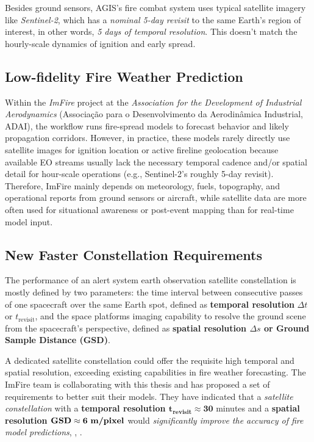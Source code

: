 Besides ground sensors, AGIS’s fire combat system uses typical satellite imagery 
like \emph{Sentinel-2}, which has a \emph{nominal 5-day revisit} to the same Earth’s region of 
interest, in other words, \emph{5 days of temporal resolution}\cite{esa_s2_facts}. 
This doesn’t match the hourly-scale dynamics of ignition and early spread.

\subsection{Low-fidelity Fire Weather Prediction}

Within the \emph{ImFire} project at the \emph{Association for the Development of Industrial Aerodynamics} (Associação para o Desenvolvimento da Aerodinâmica Industrial, ADAI), the workflow runs fire-spread models to forecast behavior and likely propagation corridors\cite{pereira_metaheuristic_2024}. However, in practice, these models rarely directly use satellite images for ignition location or active fireline geolocation because available EO streams usually lack the necessary temporal cadence and/or spatial detail for hour-scale operations (e.g., Sentinel-2’s roughly 5-day revisit). Therefore, ImFire mainly depends on meteorology, fuels, topography, and operational reports from ground sensors or aircraft, while satellite data are more often used for situational awareness or post-event mapping than for real-time model input.

\subsection{New Faster Constellation Requirements}

The performance of an alert system earth observation satellite constellation is mostly defined by two parameters: the time interval between consecutive passes of one spacecraft over the same Earth spot, defined as \textbf{temporal resolution} $\Delta t$ or $t_{\text{revisit}}$, and the space platforms imaging capability to resolve the ground scene from the spacecraft's perspective, defined as \textbf{spatial resolution $\Delta s$ or Ground Sample Distance (GSD)}. 

A dedicated satellite constellation could offer the requisite high temporal and spatial resolution, exceeding existing capabilities in fire weather forecasting. The ImFire team is collaborating with this thesis and has proposed a set of requirements to better suit their models. They have indicated that a \textit{satellite constellation} with a \textbf{temporal resolution $\mathbf{{t_{revisit} \approx 30}}$} minutes and a \textbf{spatial resolution\textbf{ }$\mathbf{{GSD \approx 6 \text{ \textbf{m/pixel}}}}$  }would \textit{significantly improve the accuracy of fire model predictions}, ,
\cite{ipcc2023syr,pereira2024fire,benali2023ptfiresprd}.

